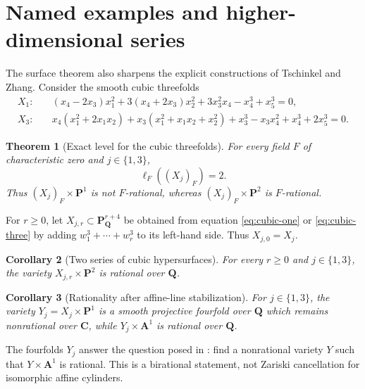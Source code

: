 \documentclass[11pt]{article}
\newtheorem{theorem}{Theorem}[section]
\newtheorem{corollary}[theorem]{Corollary}
\theoremstyle{remark}
\newcommand{\A}{\mathbf A}
\newcommand{\C}{\mathbf C}
\newcommand{\PP}{\mathbf P}
\begin{document}
\section{Named examples and higher-dimensional series}\label{sec:rationality}

The surface theorem also sharpens the explicit constructions of Tschinkel
and Zhang.
Consider the smooth cubic threefolds
\begin{align}
X_1:\quad &(x_4-2x_3)x_1^2+3(x_4+2x_3)x_2^2
 +3x_3^2x_4-x_4^3+x_5^3=0, \label{eq:cubic-one}\\
X_3:\quad &x_4(x_1^2+2x_1x_2)+x_3(x_1^2+x_1x_2+x_2^2)
 +x_3^3-x_3x_4^2+x_4^3+2x_5^3=0. \label{eq:cubic-three}
\end{align}

\begin{theorem}[Exact level for the cubic threefolds]
\label{thm:cubic-level}
%
%
%
For every field \(F\) of characteristic zero and \(j\in\{1,3\}\),
\[
 \ell_F((X_j)_F)=2.
\]
Thus \((X_j)_F\times\PP^1\) is not \(F\)-rational, whereas
\((X_j)_F\times\PP^2\) is \(F\)-rational.
\end{theorem}

For \(r\geq0\), let \(X_{j,r}\subset\PP^{r+4}_{\mathbf Q}\) be obtained
from equation \eqref{eq:cubic-one} or \eqref{eq:cubic-three} by adding
\(w_1^3+\cdots+w_r^3\) to its left-hand side.  Thus \(X_{j,0}=X_j\).

\begin{corollary}[Two series of cubic hypersurfaces]
\label{cor:cubics}
%
%
%
For every \(r\geq0\) and \(j\in\{1,3\}\), the variety
\(X_{j,r}\times\PP^2\) is rational over \(\mathbf Q\).
\end{corollary}

\begin{corollary}[Rationality after affine-line stabilization]
\label{cor:affine-line}
%
%
For \(j\in\{1,3\}\), the variety \(Y_j=X_j\times\PP^1\) is a smooth
projective fourfold over \(\mathbf Q\) which remains nonrational over
\(\C\), while \(Y_j\times\A^1\) is rational over \(\mathbf Q\).
\end{corollary}

The fourfolds \(Y_j\) answer the question posed in \cite[p.~13]{TZ}: find a
nonrational variety \(Y\) such that \(Y\times\A^1\) is rational.  This is a
birational statement, not Zariski cancellation for isomorphic affine
cylinders.
\end{document}
